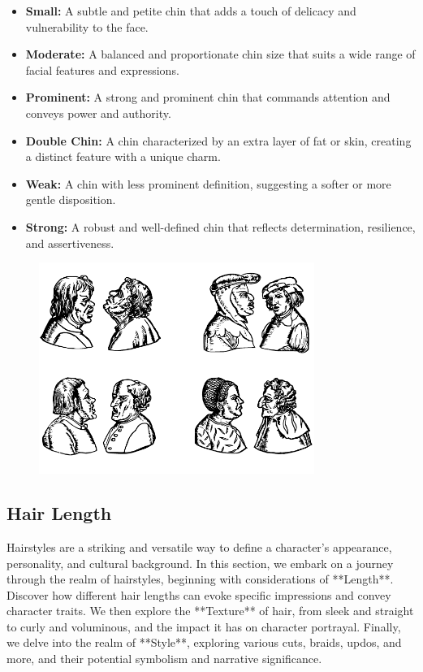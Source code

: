 \documentclass[12pt]{book}  %
\begin{document}
\begin{itemize}
    \item \textbf{Small:} A subtle and petite chin that adds a touch of delicacy and vulnerability to the face.
    \item \textbf{Moderate:} A balanced and proportionate chin size that suits a wide range of facial features and expressions.
    \item \textbf{Prominent:} A strong and prominent chin that commands attention and conveys power and authority.
    \item \textbf{Double Chin:} A chin characterized by an extra layer of fat or skin, creating a distinct feature with a unique charm.
    \item \textbf{Weak:} A chin with less prominent definition, suggesting a softer or more gentle disposition.
    \item \textbf{Strong:} A robust and well-defined chin that reflects determination, resilience, and assertiveness.
\end{itemize}

\begin{figure}[h]
    \centering
    \includegraphics[width=0.8\textwidth]{./images/physical_03.pdf}
\end{figure}

\subsection{\textbf{Hair Length}}

Hairstyles are a striking and versatile way to define a character's appearance, personality, and cultural background. In this section, we embark on a journey through the realm of hairstyles, beginning with considerations of **Length**. Discover how different hair lengths can evoke specific impressions and convey character traits. We then explore the **Texture** of hair, from sleek and straight to curly and voluminous, and the impact it has on character portrayal. Finally, we delve into the realm of **Style**, exploring various cuts, braids, updos, and more, and their potential symbolism and narrative significance.
\end{document}
